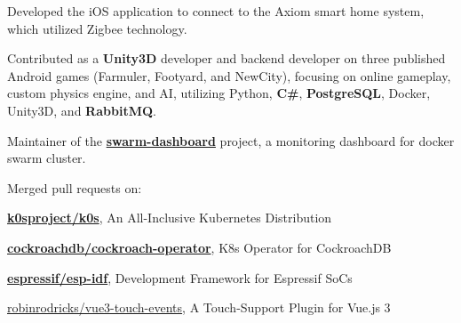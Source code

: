 \documentclass[letterpaper]{deedy-resume} %
\begin{document}
\begin{minipage}[t]{0.66\textwidth}
\begin{tightitemize}
\end{tightitemize}

\sectionspace %



\begin{tightitemize}
\item Developed the iOS application to connect to the Axiom smart home system, which utilized Zigbee technology.
\end{tightitemize}

\sectionspace %



\begin{tightitemize}
\item Contributed as a {\bf Unity3D} developer and backend developer on three published Android games (Farmuler, Footyard, and NewCity), focusing on online gameplay, custom physics engine, and AI, utilizing Python, {\bf C\#}, {\bf PostgreSQL}, Docker, Unity3D, and {\bf RabbitMQ}.
\end{tightitemize}

\sectionspace %



\descript{}
\nolocation
\begin{tightitemize}
\item Maintainer of the \href{https://github.com/mohsenasm/swarm-dashboard}{\bf swarm-dashboard} project, a monitoring dashboard for docker swarm cluster.
\item Merged pull requests on:
\vspace{0.2cm}
\begin{tightitemize}
\item \href{https://github.com/k0sproject/k0s}{\bf k0sproject/k0s}{\footnotesize , An All-Inclusive Kubernetes Distribution}
\item \href{https://github.com/cockroachdb/cockroach-operator}{\bf cockroachdb/cockroach-operator}{\footnotesize , K8s Operator for CockroachDB}
\item \href{https://github.com/espressif/esp-idf}{\bf espressif/esp-idf}{\footnotesize , Development Framework for Espressif SoCs}
\item \href{https://github.com/robinrodricks/vue3-touch-events}{robinrodricks/vue3-touch-events}{\footnotesize , A Touch-Support Plugin for Vue.js 3}
\end{tightitemize}
\end{tightitemize}


\end{minipage}
\end{document}
